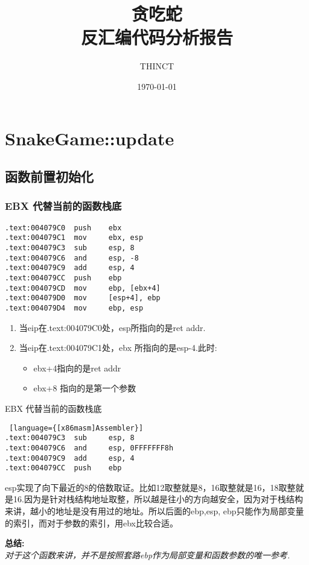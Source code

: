 \documentclass[AutoFakeBold,AutoFakeSlant]{beamer}
\title{\textbf{贪吃蛇}\\反汇编代码分析报告}
\date{\today}
\author{THINCT}
\begin{document}
	\maketitle 
	
	
	\section{SnakeGame::update}
	
	\subsection{函数前置初始化}
	
	\begin{frame}[fragile]
		\frametitle{EBX 代替当前的函数栈底}
		\begin{lstlisting}[language={[x86masm]Assembler}]
.text:004079C0  push    ebx
.text:004079C1  mov     ebx, esp
.text:004079C3  sub     esp, 8
.text:004079C6  and     esp, -8
.text:004079C9  add     esp, 4
.text:004079CC  push    ebp
.text:004079CD  mov     ebp, [ebx+4]
.text:004079D0  mov     [esp+4], ebp
.text:004079D4  mov     ebp, esp
		\end{lstlisting}
		\begin{enumerate}
			\item 当eip在.text:004079C0处，esp所指向的是ret addr. 
			\item 当eip在.text:004079C1处，ebx 所指向的是esp-4.此时:
			\begin{itemize}
					\item ebx+4指向的是ret addr
					\item ebx+8 指向的是第一个参数
			\end{itemize}
		\end{enumerate}
	\end{frame}
	
	
	\begin{frame}[fragile]{EBX 代替当前的函数栈底}
		\begin{lstlisting} [language={[x86masm]Assembler}]
.text:004079C3  sub     esp, 8
.text:004079C6  and     esp, 0FFFFFFF8h
.text:004079C9  add     esp, 4
.text:004079CC  push    ebp
		\end{lstlisting} 
		esp实现了向下最近的8的倍数取证。比如12取整就是8，16取整就是16，18取整就是16.因为是针对栈结构地址取整，所以越是往小的方向越安全，因为对于栈结构来讲，越小的地址是没有用过的地址。所以后面的ebp,esp, ebp只能作为局部变量的索引，而对于参数的索引，用ebx比较合适。
		
		\textbf {总结:}\\
		\emph {对于这个函数来讲，并不是按照套路ebp作为局部变量和函数参数的唯一参考.} 
	\end{frame}
	
\end{document}
